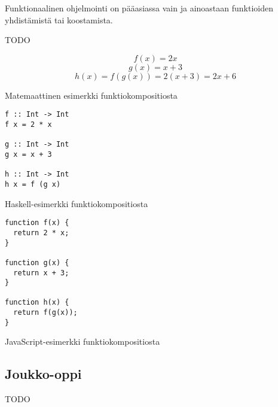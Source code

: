 Funktionaalinen ohjelmointi on pääasiassa vain ja ainoastaan funktioiden yhdistämistä tai koostamista.


TODO

\begin{code}
	\begin{equation}
		f(x) = 2x
	\end{equation}
	\begin{equation}
		g(x) = x + 3
	\end{equation}
	\begin{equation}
		h(x) = f(g(x)) = 2(x + 3) = 2x + 6
	\end{equation}
	\caption{Matemaattinen esimerkki funktiokompositiosta}
	\label{equation:composition}
\end{code}
\bigskip

\begin{code}
	\begin{verbatim}
f :: Int -> Int
f x = 2 * x

g :: Int -> Int
g x = x + 3

h :: Int -> Int
h x = f (g x)
\end{verbatim}
	\caption{Haskell-esimerkki funktiokompositiosta}
	\label{code:haskell_composition}
\end{code}
\bigskip
\begin{code}
	\begin{verbatim}
function f(x) {
  return 2 * x;
}

function g(x) {
  return x + 3;
}

function h(x) {
  return f(g(x));
}
\end{verbatim}
	\caption{JavaScript-esimerkki funktiokompositiosta}
	\label{code:javascript_composition}
\end{code}


\subsection{Joukko-oppi}

TODO

